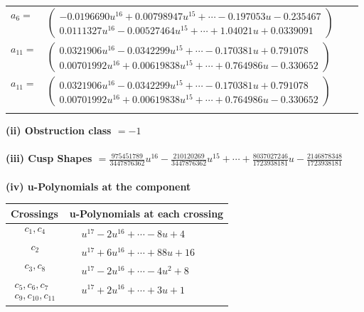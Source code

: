 \documentclass[1p]{elsarticle_modified}
\theoremstyle{definition}
\begin{document}
\begin{tabular}{m{7pt} m{180pt} m{7pt} m{180pt} }
\flushright $a_{6}=$&$\begin{pmatrix}-0.0196690 u^{16}+0.00798947 u^{15}+\cdots-0.197053 u-0.235467\\0.0111327 u^{16}-0.00527464 u^{15}+\cdots+1.04021 u+0.0339091\end{pmatrix}$ \\
\flushright $a_{11}=$&$\begin{pmatrix}0.0321906 u^{16}-0.0342299 u^{15}+\cdots-0.170381 u+0.791078\\0.00701992 u^{16}+0.00619838 u^{15}+\cdots+0.764986 u-0.330652\end{pmatrix}$\\ \flushright $a_{11}=$&$\begin{pmatrix}0.0321906 u^{16}-0.0342299 u^{15}+\cdots-0.170381 u+0.791078\\0.00701992 u^{16}+0.00619838 u^{15}+\cdots+0.764986 u-0.330652\end{pmatrix}$\\&\end{tabular}
\flushleft \textbf{(ii) Obstruction class $= -1$}\\~\\
\flushleft \textbf{(iii) Cusp Shapes $= \frac{975451789}{3447876362} u^{16}-\frac{210120269}{3447876362} u^{15}+\cdots+\frac{8037027246}{1723938181} u-\frac{2146878348}{1723938181}$}\\~\\
\newpage\renewcommand{\arraystretch}{1}
\flushleft \textbf{(iv) u-Polynomials at the component}\newline \\
\begin{tabular}{m{50pt}|m{274pt}}
Crossings & \hspace{64pt}u-Polynomials at each crossing \\
\hline $$\begin{aligned}c_{1},c_{4}\end{aligned}$$&$\begin{aligned}
&u^{17}-2 u^{16}+\cdots-8 u+4
\end{aligned}$\\
\hline $$\begin{aligned}c_{2}\end{aligned}$$&$\begin{aligned}
&u^{17}+6 u^{16}+\cdots+88 u+16
\end{aligned}$\\
\hline $$\begin{aligned}c_{3},c_{8}\end{aligned}$$&$\begin{aligned}
&u^{17}-2 u^{16}+\cdots-4 u^2+8
\end{aligned}$\\
\hline $$\begin{aligned}c_{5},c_{6},c_{7}\\c_{9},c_{10},c_{11}\end{aligned}$$&$\begin{aligned}
&u^{17}+2 u^{16}+\cdots+3 u+1
\end{aligned}$\\
\hline
\end{tabular}\\~\\
\end{document}
